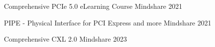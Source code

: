 



\begin{cvhonors}

  \cvhonor
    {Comprehensive PCIe 5.0 eLearning Course} %
    {Mindshare} %
    {} %
    {2021} %

  \cvhonor
    {PIPE - Physical Interface for PCI Express and more} %
    {Mindshare} %
    {} %
    {2021} %

  \cvhonor
    {Comprehensive CXL 2.0} %
    {Mindshare} %
    {} %
    {2023} %




\end{cvhonors}





